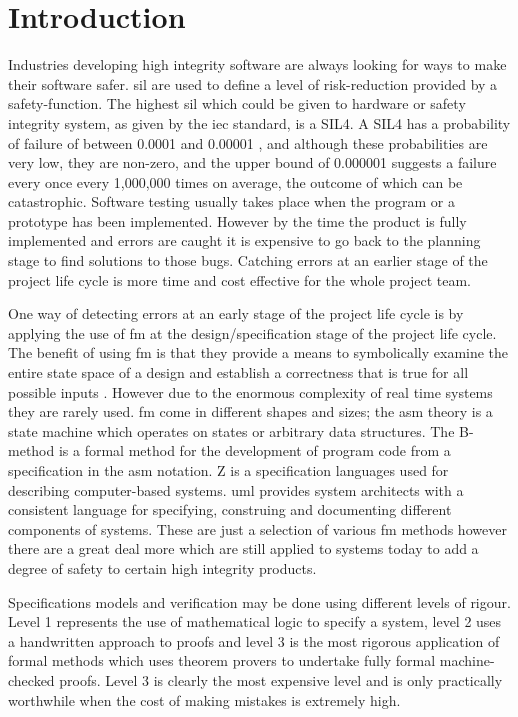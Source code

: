 
\chapter{Introduction}
\label{ch:introduction}

Industries developing high integrity software are always looking for ways to make their software safer. \gls{sil} are used to define a level of risk-reduction provided by a safety-function. The highest \gls{sil} which could be given to hardware or safety integrity system, as given by the \gls{iec} standard, is a SIL4. A SIL4 has a probability of failure of between 0.0001 and 0.00001 \cite{IEC61508}, and although these probabilities are very low, they are non-zero, and the upper bound of 0.000001 suggests a failure every once every 1,000,000 times on average, the outcome of which can be catastrophic. Software testing usually takes place when the program or a prototype has been implemented. However by the time the product is fully implemented and errors are caught it is expensive to go back to the planning stage to find solutions to those bugs. Catching errors at an earlier stage of the project life cycle is more time and cost effective for the whole project team.

One way of detecting errors at an early stage of the project life cycle is by applying the use of \gls{fm} at the design/specification stage of the project life cycle. The benefit of using \gls{fm} is that they provide a means to symbolically examine the entire state space of a design and establish a correctness that is true for all possible inputs \cite{wifrm}. However due to the enormous complexity of real time systems they are rarely used. \Gls{fm} come in different shapes and sizes; the \gls{asm} theory is a state machine which operates on states or arbitrary data structures. The B-method \cite{bmeth} is a formal method for the development of program code from a specification in the \gls{asm} notation. Z \cite{spiveyreferencemanual} is a specification languages used for describing computer-based systems. \Gls{uml} provides system architects with a consistent language for specifying, construing and documenting different components of systems. These are just a selection of various \gls{fm} methods however there are a great deal more which are still applied to systems today to add a degree of safety to certain high integrity products.

Specifications models and verification may be done using different levels of rigour. Level 1 represents the use of mathematical logic to specify a system, level 2 uses a handwritten approach to proofs and level 3 is the most rigorous application of formal methods which uses theorem provers to undertake fully formal machine-checked proofs. Level 3 is clearly the most expensive level and is only practically worthwhile when the cost of making mistakes is extremely high.

